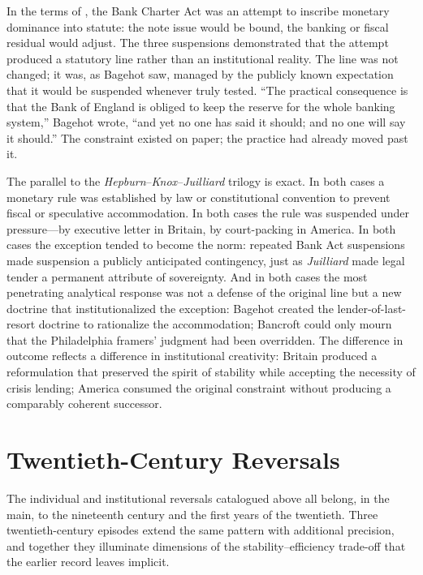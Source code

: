 \documentclass[12pt]{article}
\begin{document}
In the terms of \citet{Sargent2011}, the Bank Charter Act was an attempt
to inscribe monetary dominance into statute: the note issue would be
bound, the banking or fiscal residual would adjust.  The three
suspensions demonstrated that the attempt produced a statutory line
rather than an institutional reality.  The line was not changed; it was,
as Bagehot saw, managed by the publicly known expectation that it would
be suspended whenever truly tested.  ``The practical consequence is
that the Bank of England is obliged to keep the reserve for the whole
banking system,'' Bagehot wrote, ``and yet no one has said it should;
and no one will say it should.''  The constraint existed on paper; the
practice had already moved past it.

The parallel to the \textit{Hepburn}--\textit{Knox}--\textit{Juilliard}
trilogy is exact.  In both cases a monetary rule was established by law
or constitutional convention to prevent fiscal or speculative
accommodation.  In both cases the rule was suspended under pressure---by
executive letter in Britain, by court-packing in America.  In both cases
the exception tended to become the norm: repeated Bank Act suspensions
made suspension a publicly anticipated contingency, just as
\textit{Juilliard} made legal tender a permanent attribute of sovereignty.
And in both cases the most penetrating analytical response was not a
defense of the original line but a new doctrine that institutionalized
the exception: Bagehot created the lender-of-last-resort doctrine to
rationalize the accommodation; Bancroft could only mourn that the
Philadelphia framers' judgment had been overridden.  The difference in
outcome reflects a difference in institutional creativity: Britain
produced a reformulation that preserved the spirit of stability while
accepting the necessity of crisis lending; America consumed the original
constraint without producing a comparably coherent successor.


\section{Twentieth-Century Reversals}
\label{sec:twentieth}

The individual and institutional reversals catalogued above all belong,
in the main, to the nineteenth century and the first years of the
twentieth.  Three twentieth-century episodes extend the same pattern
with additional precision, and together they illuminate dimensions of
the stability--efficiency trade-off that the earlier record leaves
implicit.
\end{document}

